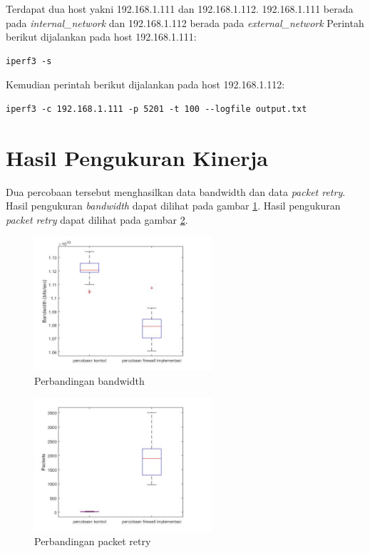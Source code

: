 Terdapat dua host yakni 192.168.1.111 dan 192.168.1.112. 192.168.1.111 berada pada \textit{internal\_network} dan 192.168.1.112 berada pada \textit{external\_network} Perintah berikut dijalankan pada host 192.168.1.111:
\begin{lstlisting}
iperf3 -s
\end{lstlisting}

\noindent Kemudian perintah berikut dijalankan pada host 192.168.1.112:
\begin{lstlisting}
iperf3 -c 192.168.1.111 -p 5201 -t 100 --logfile output.txt
\end{lstlisting}


\section{Hasil Pengukuran Kinerja}

Dua percobaan tersebut menghasilkan data bandwidth dan data \textit{packet retry}. Hasil pengukuran \textit{bandwidth} dapat dilihat pada gambar \ref{fig:bandwidth_boxplot}. Hasil pengukuran \textit{packet retry} dapat dilihat pada gambar \ref{fig:retr_boxplot}.

\begin{figure}[H]
	\centering
	\includegraphics[width=250px]{resources/bandwidth_boxplot.jpg}
	\caption{Perbandingan bandwidth}
	\label{fig:bandwidth_boxplot}
\end{figure}

\begin{figure}[H]
	\centering
	\includegraphics[width=250px]{resources/retr_boxplot.jpg}
	\caption{Perbandingan packet retry}
	\label{fig:retr_boxplot}
\end{figure}

